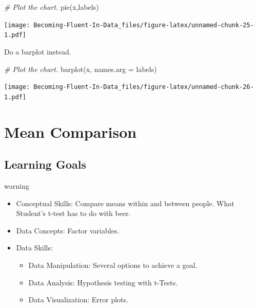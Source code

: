 \documentclass[
]{book}
\newenvironment{Shaded}{\begin{snugshade}}{\end{snugshade}}
\newcommand{\AttributeTok}[1]{\textcolor[rgb]{0.77,0.63,0.00}{#1}}
\newcommand{\CommentTok}[1]{\textcolor[rgb]{0.56,0.35,0.01}{\textit{#1}}}
\newcommand{\FunctionTok}[1]{\textcolor[rgb]{0.00,0.00,0.00}{#1}}
\newcommand{\NormalTok}[1]{#1}
\providecommand{\tightlist}{%
  \setlength{\itemsep}{0pt}\setlength{\parskip}{0pt}}
\begin{document}
\begin{Shaded}
\begin{Highlighting}[]
\CommentTok{\# Plot the chart.}
\FunctionTok{pie}\NormalTok{(x,labels)}
\end{Highlighting}
\end{Shaded}

\texttt{[image: Becoming-Fluent-In-Data\_files/figure-latex/unnamed-chunk-25-1.pdf]}

Do a barplot instead.

\begin{Shaded}
\begin{Highlighting}[]
\CommentTok{\# Plot the chart.}
\FunctionTok{barplot}\NormalTok{(x, }\AttributeTok{names.arg =}\NormalTok{ labels)}
\end{Highlighting}
\end{Shaded}

\texttt{[image: Becoming-Fluent-In-Data\_files/figure-latex/unnamed-chunk-26-1.pdf]}

\hypertarget{mean-comparison}{%
\chapter{Mean Comparison}\label{mean-comparison}}

\hypertarget{learning-goals-1}{%
\section{Learning Goals}\label{learning-goals-1}}

\begin{infobox2}warning

\begin{itemize}
\tightlist
\item
  Conceptual Skills: Compare means within and between people. What Student's t-test has to do with beer.
\item
  Data Concepts: Factor variables.
\item
  Data Skills:

  \begin{itemize}
  \tightlist
  \item
    Data Manipulation: Several options to achieve a goal.
  \item
    Data Analysis: Hypothesis testing with t-Tests.
  \item
    Data Visualization: Error plots.
  \end{itemize}
\end{itemize}

\end{infobox2}
\end{document}

